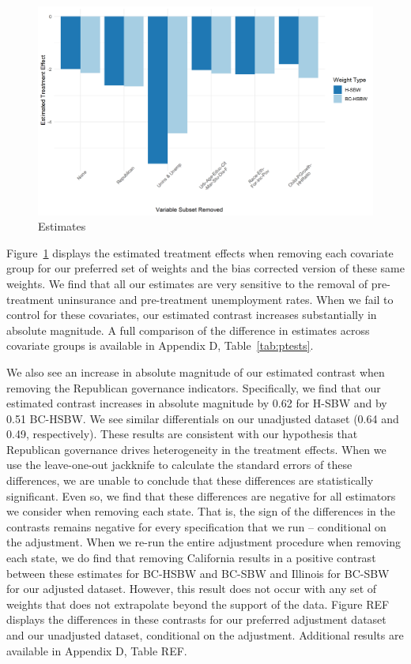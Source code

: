 \documentclass[12pt]{article}
\begin{document}
\begin{figure}[]
\begin{center}
    \includegraphics[scale=0.6]{01_Plots/loo-covariates-main-c1.png}
    \caption{Estimates}
    \label{fig:loocovariates}
\end{center}
\end{figure}

Figure~\ref{fig:loocovariates} displays the estimated treatment effects when removing each covariate group for our preferred set of weights and the bias corrected version of these same weights. We find that all our estimates are very sensitive to the removal of pre-treatment uninsurance and pre-treatment unemployment rates. When we fail to control for these covariates, our estimated contrast increases substantially in absolute magnitude. A full comparison of the difference in estimates across covariate groups is available in Appendix D, Table~\ref{tab:ptests}.

We also see an increase in absolute magnitude of our estimated contrast when removing the Republican governance indicators. Specifically, we find that our estimated contrast increases in absolute magnitude by 0.62 for H-SBW and by 0.51 BC-HSBW. We see similar differentials on our unadjusted dataset (0.64 and 0.49, respectively). These results are consistent with our hypothesis that Republican governance drives heterogeneity in the treatment effects. When we use the leave-one-out jackknife to calculate the standard errors of these differences, we are unable to conclude that these differences are statistically significant. Even so, we find that these differences are negative for all estimators we consider when removing each state. That is, the sign of the differences in the contrasts remains negative for every specification that we run -- conditional on the adjustment. When we re-run the entire adjustment procedure when removing each state, we do find that removing California results in a positive contrast between these estimates for BC-HSBW and BC-SBW and Illinois for BC-SBW for our adjusted dataset. However, this result does not occur with any set of weights that does not extrapolate beyond the support of the data. Figure REF displays the differences in these contrasts for our preferred adjustment dataset and our unadjusted dataset, conditional on the adjustment. Additional results are available in Appendix D, Table REF.
\end{document}
